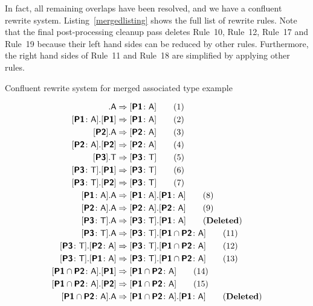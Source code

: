 \documentclass[headsepline,bibliography=totoc]{scrreport}
\newcommand{\namesym}[1]{\mathsf{#1}}
\newcommand{\proto}[1]{\bm{\mathsf{#1}}}
\newcommand{\protosym}[1]{[\proto{#1}]}
\newcommand{\assocsym}[2]{[\proto{#1}\colon\namesym{#2}]}
\theoremstyle{definition}
\theoremstyle{definition}
\theoremstyle{definition}
\begin{document}
In fact, all remaining overlaps have been resolved, and we have a confluent rewrite system. Listing~\ref{mergedlisting} shows the full list of rewrite rules. Note that the final post-processing cleanup pass deletes Rule~10, Rule~12, Rule~17 and Rule~19 because their left hand sides can be reduced by other rules. Furthermore, the right hand sides of Rule~11 and Rule~18 are simplified by applying other rules.
\begin{listing}\caption{Confluent rewrite system for merged associated type example}\label{mergedlisting}
\begin{align}
\protosym{P1}.\namesym{A}&\Rightarrow\assocsym{P1}{A}\tag{1}\\
\assocsym{P1}{A}.\protosym{P1}&\Rightarrow\assocsym{P1}{A}\tag{2}\\
\protosym{P2}.\namesym{A}&\Rightarrow\assocsym{P2}{A}\tag{3}\\
\assocsym{P2}{A}.\protosym{P2}&\Rightarrow\assocsym{P2}{A}\tag{4}\\
\protosym{P3}.\namesym{T}&\Rightarrow\assocsym{P3}{T}\tag{5}\\
\assocsym{P3}{T}.\protosym{P1}&\Rightarrow\assocsym{P3}{T}\tag{6}\\
\assocsym{P3}{T}.\protosym{P2}&\Rightarrow\assocsym{P3}{T}\tag{7}\\
\assocsym{P1}{A}.\namesym{A}&\Rightarrow\assocsym{P1}{A}.\assocsym{P1}{A}\tag{8}\\
\assocsym{P2}{A}.\namesym{A}&\Rightarrow\assocsym{P2}{A}.\assocsym{P2}{A}\tag{9}\\
\assocsym{P3}{T}.\namesym{A}&\Rightarrow\assocsym{P3}{T}.\assocsym{P1}{A}\tag{\textbf{Deleted}}\\
\assocsym{P3}{T}.\namesym{A}&\Rightarrow\assocsym{P3}{T}.[\proto{P1}\cap\proto{P2}\colon\namesym{A}]\tag{11}\\
\assocsym{P3}{T}.\assocsym{P2}{A}&\Rightarrow\assocsym{P3}{T}.[\proto{P1}\cap\proto{P2}\colon\namesym{A}]\tag{12}\\
\assocsym{P3}{T}.\assocsym{P1}{A}&\Rightarrow\assocsym{P3}{T}.[\proto{P1}\cap\proto{P2}\colon\namesym{A}]\tag{13}\\
[\proto{P1}\cap\proto{P2}\colon\namesym{A}].\protosym{P1}&\Rightarrow [\proto{P1}\cap\proto{P2}\colon\namesym{A}]\tag{14}\\
[\proto{P1}\cap\proto{P2}\colon\namesym{A}].\protosym{P2}&\Rightarrow [\proto{P1}\cap\proto{P2}\colon\namesym{A}]\tag{15}\\
[\proto{P1}\cap\proto{P2}\colon\namesym{A}].\namesym{A}&\Rightarrow[\proto{P1}\cap\proto{P2}\colon\namesym{A}].\assocsym{P1}{A}\tag{\textbf{Deleted}}\\

\end{align}
\end{listing}
\end{document}
